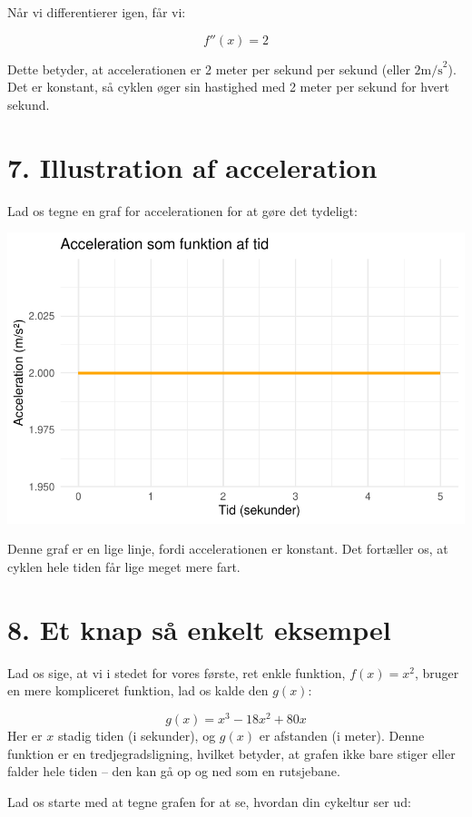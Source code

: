 \documentclass[
  letterpaper,
  DIV=11,
  numbers=noendperiod]{scrreprt}
\begin{document}
Når vi differentierer igen, får vi:

\[f''(x) = 2\]

Dette betyder, at accelerationen er 2 meter per sekund per sekund (eller
\(2 \text{m/s}^2\)). Det er konstant, så cyklen øger sin hastighed med 2
meter per sekund for hvert sekund.

\section{7. Illustration af
acceleration}\label{illustration-af-acceleration}

Lad os tegne en graf for accelerationen for at gøre det tydeligt:

\includegraphics{differentialregning_files/figure-pdf/plot-acceleration-1.pdf}

Denne graf er en lige linje, fordi accelerationen er konstant. Det
fortæller os, at cyklen hele tiden får lige meget mere fart.

\section{8. Et knap så enkelt
eksempel}\label{et-knap-suxe5-enkelt-eksempel}

Lad os sige, at vi i stedet for vores første, ret enkle funktion,
\(f(x) = x^2\), bruger en mere kompliceret funktion, lad os kalde den
\(g(x)\):

\[ g(x) = x^3 - 18x^2 + 80x \] Her er \(x\) stadig tiden (i sekunder),
og \(g(x)\) er afstanden (i meter). Denne funktion er en
tredjegradsligning, hvilket betyder, at grafen ikke bare stiger eller
falder hele tiden -- den kan gå op og ned som en rutsjebane.

Lad os starte med at tegne grafen for at se, hvordan din cykeltur ser
ud:
\end{document}
